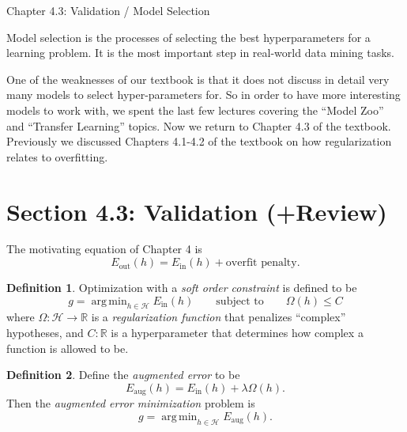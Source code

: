 \documentclass[10pt]{exam}
\theoremstyle{definition}
\newtheorem{defn}{Definition}
\newcommand{\R}{\mathbb R}
\DeclareMathOperator*{\argmin}{arg\,min}
\newcommand{\Ein}{E_{\text{in}}}
\newcommand{\Eout}{E_{\text{out}}}
\newcommand{\Eaug}{E_{\text{aug}}}
\begin{document}
\begin{center}
{
\Huge
Chapter 4.3: Validation / Model Selection
}
\end{center}


Model selection is the processes of selecting the best hyperparameters for a learning problem.
It is the most important step in real-world data mining tasks.

One of the weaknesses of our textbook is that it does not discuss in detail very many models to select hyper-parameters for.
So in order to have more interesting models to work with,
we spent the last few lectures covering the ``Model Zoo'' and ``Transfer Learning'' topics.
Now we return to Chapter 4.3 of the textbook.
Previously we discussed Chapters 4.1-4.2 of the textbook on how regularization relates to overfitting.

\section*{Section 4.3: Validation (+Review)}

The motivating equation of Chapter 4 is
\begin{equation}
    \Eout(h) = \Ein(h) + \text{overfit penalty}.
\end{equation}


\vspace{2in}

\begin{defn}
Optimization with a \emph{soft order constraint} is defined to be
\begin{equation}
    \label{eq:soc}
    g = \argmin_{h\in\mathcal H} \Ein(h) \qquad \text{subject to}\qquad \Omega(h) \le C
\end{equation}
where $\Omega : \mathcal H \to \R$ is a \emph{regularization function} that penalizes ``complex'' hypotheses,
    and $C : \R$ is a hyperparameter that determines how complex a function is allowed to be.
\end{defn}

\begin{defn}
Define the \emph{augmented error} to be
\begin{equation}
    \Eaug(h) = \Ein(h) + \lambda\Omega(h)
    .
\end{equation}
    Then the \emph{augmented error minimization} problem is
\begin{equation}
    \label{eq:rlm}
    g = \argmin_{h\in\mathcal H} \Eaug(h)
    .
\end{equation}
\end{defn}
\end{document}
